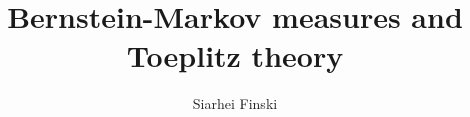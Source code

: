 \documentclass[12pt]{article}
\title{\vspace*{-1.5cm} Bernstein-Markov measures and Toeplitz theory}
\author
{Siarhei Finski
}
\date{}
\numberwithin{equation}{section}
\theoremstyle{theorem}
\theoremstyle{definition}
\theoremstyle{remark}
\newenvironment{sciabstract}{}
\begin{document}
 


\maketitle 

\vspace*{-0.7cm}



\vspace*{0.3cm}

\begin{sciabstract}
  \textbf{Abstract.} 
	We prove that Toeplitz operators associated with a Bernstein-Markov measure on a compact complex manifold endowed with a big line bundle form an algebra under composition.
	As an application, we derive a Szegő-type spectral equidistribution result for this class of operators.
	A key component of our approach is the off-diagonal asymptotic analysis of the Bergman kernel, also known as the Christoffel-Darboux kernel.
\end{sciabstract}

\pagestyle{fancy}
\lhead{}
\rhead{\thepage}
\cfoot{}


\newcommand{\Addresses}{{%
  \bigskip
  \footnotesize
  \noindent \textsc{Siarhei Finski, CNRS-CMLS, École Polytechnique F-91128 Palaiseau Cedex, France.}\par\nopagebreak
  \noindent  \textit{E-mail }: \texttt{finski.siarhei@gmail.com}.
}} 

\vspace*{0.25cm}

\par\noindent\rule{1.25em}{0.4pt} \textbf{Table of contents} \hrulefill


\vspace*{-1.5cm}

\tableofcontents

\vspace*{-0.2cm}

\noindent \hrulefill

\end{document}
